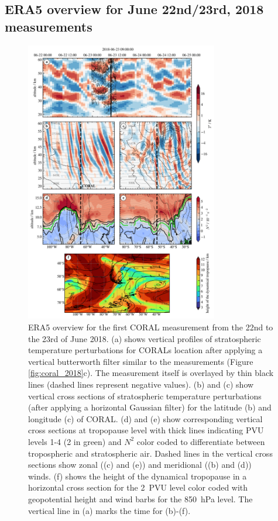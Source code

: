 \subsection*{ERA5 overview for June 22nd/23rd, 2018 measurements}
\begin{figure}[tbp]
    \centering
    \includegraphics[width=0.75\textwidth]{figures_lidar/era5_trop_strat_33.png}
    \caption{ERA5 overview for the first CORAL measurement from the 22nd to the 23rd of June 2018. (a) shows vertical profiles of stratospheric temperature perturbations for CORALs location after applying a vertical butterworth filter similar to the measurements (Figure \ref{fig:coral_2018}c). The measurement itself is overlayed by thin black lines (dashed lines represent negative values). (b) and (c) show vertical cross sections of stratospheric temperature perturbations (after applying a horizontal Gaussian filter) for the latitude (b) and longitude (c) of CORAL. (d) and (e) show corresponding vertical cross sections at tropopause level with thick lines indicating PVU levels 1-4 (2 in green) and $N^2$ color coded to differentiate between tropospheric and stratospheric air. Dashed lines in the vertical cross sections show zonal ((c) and (e)) and meridional ((b) and (d)) winds. (f) shows the height of the dynamical tropopause in a horizontal cross section for the \SI{2}{PVU} level color coded with geopotential height and wind barbs for the \SI{850}{hPa} level. The vertical line in (a) marks the time for (b)-(f).}
    \label{fig:era5_2018}
\end{figure}
